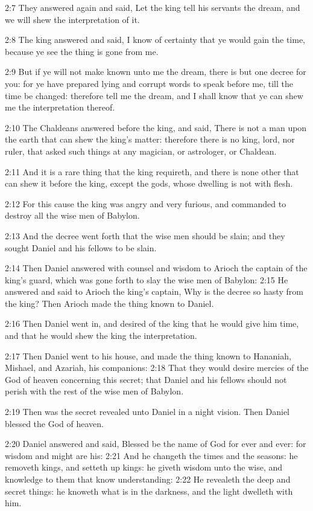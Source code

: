 2:7 They answered again and said, Let the king tell his servants the dream, and we will shew the interpretation of it.

2:8 The king answered and said, I know of certainty that ye would gain the time, because ye see the thing is gone from me.

2:9 But if ye will not make known unto me the dream, there is but one decree for you: for ye have prepared lying and corrupt words to speak before me, till the time be changed: therefore tell me the dream, and I shall know that ye can shew me the interpretation thereof.

2:10 The Chaldeans answered before the king, and said, There is not a man upon the earth that can shew the king's matter: therefore there is no king, lord, nor ruler, that asked such things at any magician, or astrologer, or Chaldean.

2:11 And it is a rare thing that the king requireth, and there is none other that can shew it before the king, except the gods, whose dwelling is not with flesh.

2:12 For this cause the king was angry and very furious, and commanded to destroy all the wise men of Babylon.

2:13 And the decree went forth that the wise men should be slain; and they sought Daniel and his fellows to be slain.

2:14 Then Daniel answered with counsel and wisdom to Arioch the captain of the king's guard, which was gone forth to slay the wise men of Babylon: 2:15 He answered and said to Arioch the king's captain, Why is the decree so hasty from the king? Then Arioch made the thing known to Daniel.

2:16 Then Daniel went in, and desired of the king that he would give him time, and that he would shew the king the interpretation.

2:17 Then Daniel went to his house, and made the thing known to Hananiah, Mishael, and Azariah, his companions: 2:18 That they would desire mercies of the God of heaven concerning this secret; that Daniel and his fellows should not perish with the rest of the wise men of Babylon.

2:19 Then was the secret revealed unto Daniel in a night vision. Then Daniel blessed the God of heaven.

2:20 Daniel answered and said, Blessed be the name of God for ever and ever: for wisdom and might are his: 2:21 And he changeth the times and the seasons: he removeth kings, and setteth up kings: he giveth wisdom unto the wise, and knowledge to them that know understanding: 2:22 He revealeth the deep and secret things: he knoweth what is in the darkness, and the light dwelleth with him.


